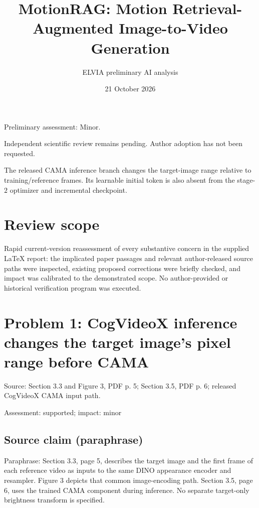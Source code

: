 \documentclass[11pt]{article}
\begin{document}
\title{MotionRAG: Motion Retrieval-Augmented Image-to-Video Generation}

\author{ELVIA preliminary AI analysis}\date{21 October 2026}\maketitle

Preliminary assessment: Minor.\par

Independent scientific review remains pending. Author adoption has not been requested.

The released CAMA inference branch changes the target-image range relative to training/reference frames. Its learnable initial token is also absent from the stage-\(2\) optimizer and incremental checkpoint.

\section*{Review scope}

Rapid current-version reassessment of every substantive concern in the supplied LaTeX report: the implicated paper passages and relevant author-released source paths were inspected, existing proposed corrections were briefly checked, and impact was calibrated to the demonstrated scope. No author-provided or historical verification program was executed.

\section*{Problem 1: CogVideoX inference changes the target image’s pixel range before CAMA}

Source: Section 3.3 and Figure 3, PDF p. 5; Section 3.5, PDF p. 6; released CogVideoX CAMA input path.

Assessment: supported; impact: minor

\subsection*{Source claim (paraphrase)}

Paraphrase: Section 3.3, page 5, describes the target image and the first frame of each reference video as inputs to the same DINO appearance encoder and resampler. Figure 3 depicts that common image-encoding path. Section 3.5, page 6, uses the trained CAMA component during inference. No separate target-only brightness transform is specified.
\end{document}
